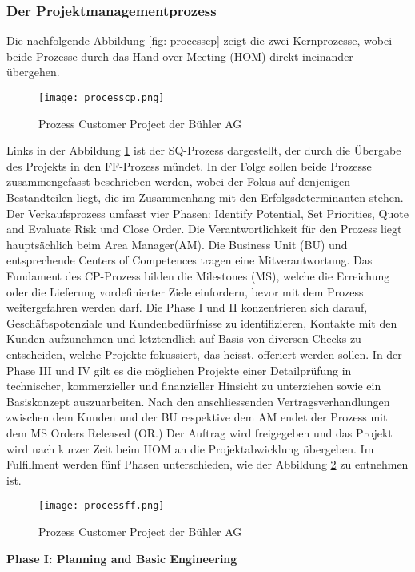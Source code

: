 \subsubsection{Der Projektmanagementprozess}\label{zweieins}
Die nachfolgende Abbildung \ref{fig: processcp} zeigt die zwei Kernprozesse, wobei beide Prozesse durch das Hand-over-Meeting (HOM) direkt ineinander übergehen. 
\begin{figure}[H]
	\centering
	\texttt{[image: processcp.png]}
	\caption{Prozess Customer Project der Bühler AG}
	\label{fig:processcp}
\end{figure}
Links in der Abbildung \ref{fig:processcp} ist der SQ-Prozess dargestellt, der durch die Übergabe des Projekts in den FF-Prozess mündet. In der Folge sollen beide Prozesse zusammengefasst beschrieben werden, wobei der Fokus auf denjenigen Bestandteilen liegt, die im Zusammenhang mit den Erfolgsdeterminanten stehen. Der Verkaufsprozess umfasst vier Phasen: Identify Potential, Set Priorities, Quote and Evaluate Risk und Close Order. Die Verantwortlichkeit für den Prozess liegt hauptsächlich beim Area Manager(AM). Die Business Unit (BU) und entsprechende Centers of Competences tragen eine Mitverantwortung. Das Fundament des CP-Prozess bilden die Milestones (MS), welche die Erreichung oder die Lieferung vordefinierter Ziele einfordern, bevor mit dem Prozess weitergefahren werden darf. Die Phase I und II konzentrieren sich darauf, Geschäftspotenziale und Kundenbedürfnisse zu identifizieren, Kontakte mit den Kunden aufzunehmen und letztendlich auf Basis von diversen Checks zu entscheiden,  welche Projekte fokussiert, das heisst, offeriert werden sollen. In der Phase III und IV gilt es die möglichen Projekte einer Detailprüfung in technischer, kommerzieller und finanzieller Hinsicht zu unterziehen sowie ein Basiskonzept auszuarbeiten. Nach den anschliessenden Vertragsverhandlungen zwischen dem Kunden und der BU respektive dem AM endet der Prozess mit dem MS Orders Released (OR.) Der Auftrag wird freigegeben und das Projekt wird nach kurzer Zeit beim HOM an die Projektabwicklung übergeben. Im Fulfillment werden fünf Phasen unterschieden, wie der Abbildung \ref{fig: processff} zu entnehmen ist.
\begin{figure}[H]
	\centering
	\texttt{[image: processff.png]}
	\caption{Prozess Customer Project der Bühler AG}
	\label{fig: processff}
\end{figure}
\textbf{Phase I: Planning and Basic Engineering}
\newline
